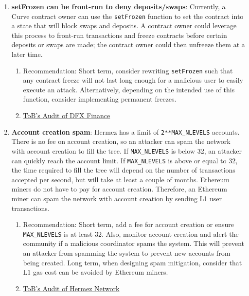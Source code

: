 \begin{enumerate}
\item\textbf{setFrozen can be front-run to deny deposits/swaps}: Currently, a Curve contract owner can use the \verb|setFrozen| function to set the contract into a state that will block swaps and deposits. A contract owner could leverage this process to front-run transactions and freeze contracts before certain deposits or swaps are made; the contract owner could then unfreeze them at a later time.
	\begin{enumerate}
	\item Recommendation: Short term, consider rewriting \verb|setFrozen| such that any contract freeze will not last long enough for a malicious user to easily execute an attack. Alternatively, depending on the intended use of this function, consider implementing permanent freezes.
	\item\href{https://github.com/dfx-finance/protocol/blob/main/audits/2021-05-03-Trail\_of\_Bits.pdf}{ToB's Audit of DFX Finance}
	\end{enumerate}

\item\textbf{Account creation spam}: Hermez has a limit of \verb|2**MAX_NLEVELS| accounts. There is no fee on account creation, so an attacker can spam the network with account creation to fill the tree. If \verb|MAX_NLEVELS| is below 32, an attacker can quickly reach the account limit. If \verb|MAX_NLEVELS| is above or equal to 32, the time required to fill the tree will depend on the number of transactions accepted per second, but will take at least a couple of months. Ethereum miners do not have to pay for account creation. Therefore, an Ethereum miner can spam the network with account creation by sending L1 user transactions.
	\begin{enumerate}
	\item Recommendation: Short term, add a fee for account creation or ensure \verb|MAX_NLEVELS| is at least 32. Also, monitor account creation and alert the community if a malicious coordinator spams the system. This will prevent an attacker from spamming the system to prevent new accounts from being created. Long term, when designing spam mitigation, consider that L1 gas cost can be avoided by Ethereum miners.
	\item\href{https://github.com/trailofbits/publications/blob/master/reviews/hermez.pdf}{ToB's Audit of Hermez Network}
	\end{enumerate}


\end{enumerate}
